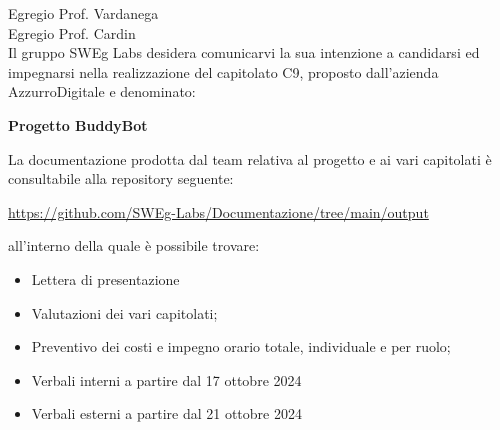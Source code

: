 Egregio Prof. Vardanega \\
Egregio Prof. Cardin \\
\sloppy
Il gruppo SWEg Labs desidera comunicarvi la sua intenzione a candidarsi ed impegnarsi nella realizzazione del capitolato C9, proposto dall'azienda \mbox{AzzurroDigitale} e denominato:
\fussy
\begin{center}\textbf{Progetto BuddyBot} \\
\end{center}
La documentazione prodotta dal team relativa al progetto e ai vari capitolati è consultabile alla repository seguente:
\begin{center}\url{https://github.com/SWEg-Labs/Documentazione/tree/main/output}
\end{center}
all'interno della quale è possibile trovare:
\begin{itemize}
    \item Lettera di presentazione
    \item Valutazioni dei vari capitolati;
    \item Preventivo dei costi e impegno orario totale, individuale e per ruolo;
    \item Verbali interni a partire dal 17 ottobre 2024
    \item Verbali esterni a partire dal 21 ottobre 2024
\end{itemize}

